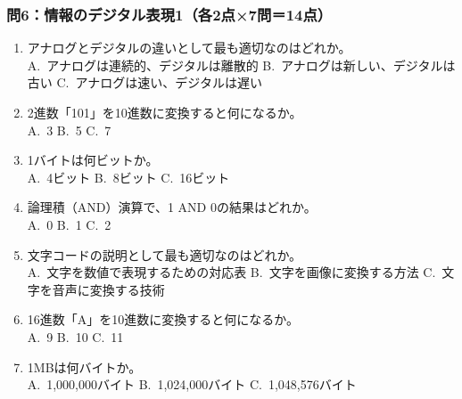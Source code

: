 \documentclass[a4paper,6pt,twoside]{jsarticle}
\begin{document}
\subsubsection*{問6：情報のデジタル表現1（各2点×7問＝14点）}
\begin{enumerate}
\item アナログとデジタルの違いとして最も適切なのはどれか。\\
A.~アナログは連続的、デジタルは離散的 \quad B.~アナログは新しい、デジタルは古い \quad C.~アナログは速い、デジタルは遅い

\item 2進数「101」を10進数に変換すると何になるか。\\
A.~3 \quad B.~5 \quad C.~7

\item 1バイトは何ビットか。\\
A.~4ビット \quad B.~8ビット \quad C.~16ビット

\item 論理積（AND）演算で、1 AND 0の結果はどれか。\\
A.~0 \quad B.~1 \quad C.~2

\item 文字コードの説明として最も適切なのはどれか。\\
A.~文字を数値で表現するための対応表 \quad B.~文字を画像に変換する方法 \quad C.~文字を音声に変換する技術

\item 16進数「A」を10進数に変換すると何になるか。\\
A.~9 \quad B.~10 \quad C.~11

\item 1MBは何バイトか。\\
A.~1,000,000バイト \quad B.~1,024,000バイト \quad C.~1,048,576バイト
\end{enumerate}
\end{document}
